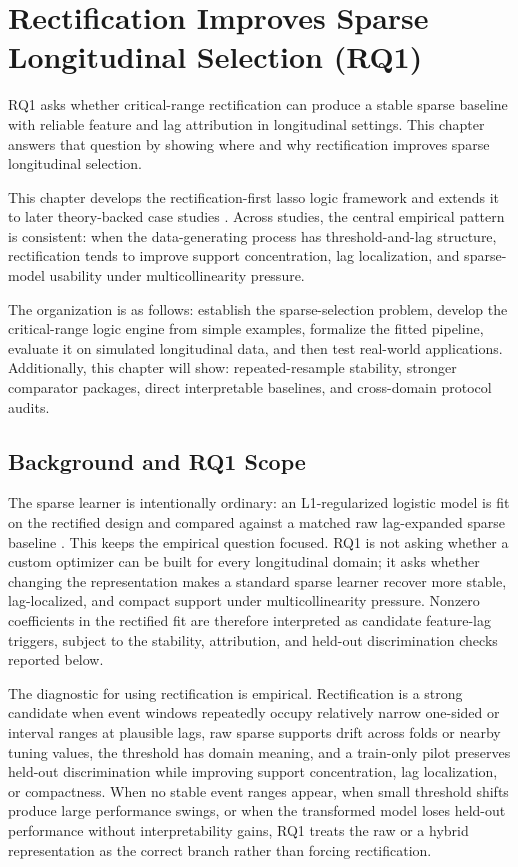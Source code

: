 
\chapter{Rectification Improves Sparse Longitudinal Selection (RQ1)}

RQ1 asks whether critical-range rectification can produce a stable sparse baseline with reliable feature and lag attribution in longitudinal settings. This chapter answers that question by showing where and why rectification improves sparse longitudinal selection.

This chapter develops the rectification-first lasso logic framework and extends it to later theory-backed case studies \autocites{orender2022,JOrender2025Efficient}. Across studies, the central empirical pattern is consistent: when the data-generating process has threshold-and-lag structure, rectification tends to improve support concentration, lag localization, and sparse-model usability under multicollinearity pressure.

The organization is as follows: establish the sparse-selection problem, develop the critical-range logic engine from simple examples, formalize the fitted pipeline, evaluate it on simulated longitudinal data, and then test real-world applications. Additionally, this chapter will show: repeated-resample stability, stronger comparator packages, direct interpretable baselines, and cross-domain protocol audits. 

\section{Background and RQ1 Scope}

The sparse learner is intentionally ordinary: an L1-regularized logistic model is fit on the rectified design and compared against a matched raw lag-expanded sparse baseline \autocites{tibshirani1996,fried2010,tay2023}. This keeps the empirical question focused. RQ1 is not asking whether a custom optimizer can be built for every longitudinal domain; it asks whether changing the representation makes a standard sparse learner recover more stable, lag-localized, and compact support under multicollinearity pressure. Nonzero coefficients in the rectified fit are therefore interpreted as candidate feature-lag triggers, subject to the stability, attribution, and held-out discrimination checks reported below.

The diagnostic for using rectification is empirical. Rectification is a strong candidate when event windows repeatedly occupy relatively narrow one-sided or interval ranges at plausible lags, raw sparse supports drift across folds or nearby tuning values, the threshold has domain meaning, and a train-only pilot preserves held-out discrimination while improving support concentration, lag localization, or compactness. When no stable event ranges appear, when small threshold shifts produce large performance swings, or when the transformed model loses held-out performance without interpretability gains, RQ1 treats the raw or a hybrid representation as the correct branch rather than forcing rectification.

